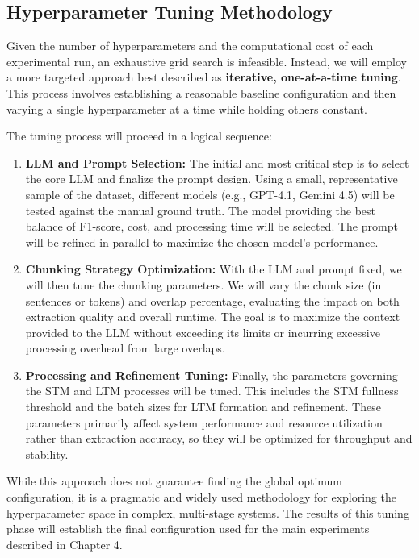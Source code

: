 \subsection{Hyperparameter Tuning Methodology}
Given the number of hyperparameters and the computational cost of each experimental run, an exhaustive grid search is infeasible. Instead, we will employ a more targeted approach best described as \textbf{iterative, one-at-a-time tuning}. This process involves establishing a reasonable baseline configuration and then varying a single hyperparameter at a time while holding others constant.

The tuning process will proceed in a logical sequence:
\begin{enumerate}
    \item \textbf{LLM and Prompt Selection:} The initial and most critical step is to select the core LLM and finalize the prompt design. Using a small, representative sample of the dataset, different models (e.g., GPT-4.1, Gemini 4.5) will be tested against the manual ground truth. The model providing the best balance of F1-score, cost, and processing time will be selected. The prompt will be refined in parallel to maximize the chosen model's performance.
    \item \textbf{Chunking Strategy Optimization:} With the LLM and prompt fixed, we will then tune the chunking parameters. We will vary the chunk size (in sentences or tokens) and overlap percentage, evaluating the impact on both extraction quality and overall runtime. The goal is to maximize the context provided to the LLM without exceeding its limits or incurring excessive processing overhead from large overlaps.
    \item \textbf{Processing and Refinement Tuning:} Finally, the parameters governing the STM and LTM processes will be tuned. This includes the STM fullness threshold and the batch sizes for LTM formation and refinement. These parameters primarily affect system performance and resource utilization rather than extraction accuracy, so they will be optimized for throughput and stability.
\end{enumerate}
While this approach does not guarantee finding the global optimum configuration, it is a pragmatic and widely used methodology for exploring the hyperparameter space in complex, multi-stage systems. The results of this tuning phase will establish the final configuration used for the main experiments described in Chapter 4.

